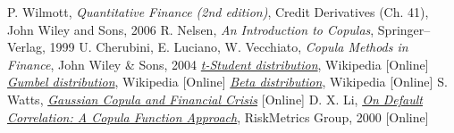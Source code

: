 \begin{thebibliography}{9}
P. Wilmott, \emph{Quantitative Finance (2nd edition)}, Credit Derivatives (Ch. 41), John Wiley and Sons, 2006 
R. Nelsen, \emph{An Introduction to Copulas}, Springer–Verlag, 1999
U. Cherubini, E. Luciano, W. Vecchiato, \emph{Copula Methods in Finance}, John Wiley \& Sons, 2004
\href{https://en.wikipedia.org/wiki/Student\%27s\_t-distribution}{\emph{t-Student distribution}}, Wikipedia [Online]
\href{https://en.wikipedia.org/wiki/Gumbel_distribution}{\emph{Gumbel distribution}}, Wikipedia [Online]
\href{https://en.wikipedia.org/wiki/Beta_distribution}{\emph{Beta distribution}}, Wikipedia [Online]
 S. Watts, \href{http://samueldwatts.com/wp-content/uploads/2016/08/Watts-Gaussian-Copula_Financial_Crisis.pdf}{\emph{Gaussian Copula and Financial Crisis}} [Online]
D. X. Li, \href{http://www.maths.lth.se/matstat/kurser/fmsn15masm23/default.pdf}{\emph{On Default Correlation: A Copula Function Approach}}, RiskMetrics Group, 2000 [Online]
\end{thebibliography}
